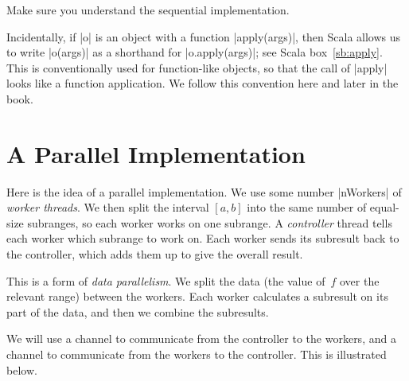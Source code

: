 \begin{instruction}
Make sure you understand the sequential implementation.
\end{instruction}

Incidentally, if |o| is an object with a function |apply(args)|, then Scala
allows us to write |o(args)| as a shorthand for |o.apply(args)|; see Scala
box~\ref{sb:apply}.  This is conventionally used for function-like objects, so
that the call of |apply| looks like a function application.  We follow this
convention here and later in the book.


\section{A Parallel Implementation}

Here is the idea of a parallel implementation.  We use some number |nWorkers|
of \emph{worker threads}.  We then split the interval $[a,b]$ into the same
number of equal-size subranges, so each worker works on one subrange.  A
\emph{controller} thread tells each worker which subrange to work on.  Each
worker sends its subresult back to the controller, which adds them up to give
the overall result.

This is a form of \emph{data parallelism}.  We split the data (the value
of~$f$ over the relevant range) between the workers.  Each worker calculates a
subresult on its part of the data, and then we combine the subresults. 


We will use a channel  to communicate from the
controller to the workers, and a channel 
to communicate from the workers to the controller.  This is illustrated below.
%
\begin{center}
\end{center}

